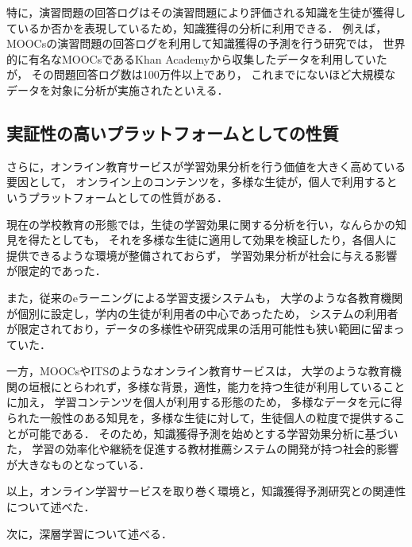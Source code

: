 特に，演習問題の回答ログはその演習問題により評価される知識を生徒が獲得しているか否かを表現しているため，知識獲得の分析に利用できる．
例えば，MOOCsの演習問題の回答ログを利用して知識獲得の予測を行う研究\cite{machardy2015toward}では，
世界的に有名なMOOCsであるKhan Academyから収集したデータを利用していたが，
その問題回答ログ数は100万件以上であり，
これまでにないほど大規模なデータを対象に分析が実施されたといえる．


\subsection{実証性の高いプラットフォームとしての性質}

さらに，オンライン教育サービスが学習効果分析を行う価値を大きく高めている要因として，
オンライン上のコンテンツを，多様な生徒が，個人で利用するというプラットフォームとしての性質がある．


現在の学校教育の形態では，生徒の学習効果に関する分析を行い，なんらかの知見を得たとしても，
それを多様な生徒に適用して効果を検証したり，各個人に提供できるような環境が整備されておらず，
学習効果分析が社会に与える影響が限定的であった．

また，従来のeラーニングによる学習支援システムも，
大学のような各教育機関が個別に設定し，学内の生徒が利用者の中心であったため，
システムの利用者が限定されており，データの多様性や研究成果の活用可能性も狭い範囲に留まっていた．


一方，MOOCsやITSのようなオンライン教育サービスは，
大学のような教育機関の垣根にとらわれず，多様な背景，適性，能力を持つ生徒が利用していることに加え，
学習コンテンツを個人が利用する形態のため，
多様なデータを元に得られた一般性のある知見を，多様な生徒に対して，生徒個人の粒度で提供することが可能である．
そのため，知識獲得予測を始めとする学習効果分析に基づいた，
学習の効率化や継続を促進する教材推薦システムの開発が持つ社会的影響が大きなものとなっている．



\vvspace

以上，オンライン学習サービスを取り巻く環境と，知識獲得予測研究との関連性について述べた．


次に，深層学習について述べる．




